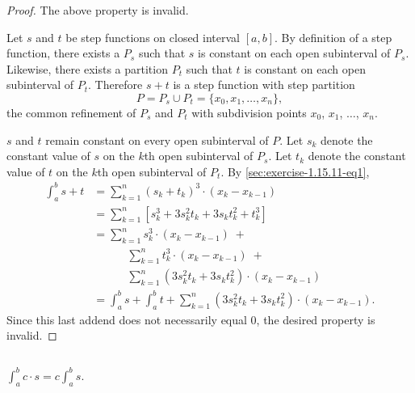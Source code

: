 \documentclass{report}
\begin{document}
\begin{proof}

  The above property is invalid.

  \divider

  Let $s$ and $t$ be step functions on closed interval $[a, b]$.
  By definition of a step function, there exists a 
    $P_s$ such that $s$ is constant on each open subinterval of $P_s$.
  Likewise, there exists a partition $P_t$ such that $t$ is constant on each
    open subinterval of $P_t$.
  Therefore $s + t$ is a step function with step partition
    $$P = P_s \cup P_t = \{x_0, x_1, \ldots, x_n\},$$
    the common refinement of $P_s$ and $P_t$ with subdivision points
    $x_0$, $x_1$, $\ldots$, $x_n$.

  $s$ and $t$ remain constant on every open subinterval of $P$.
  Let $s_k$ denote the constant value of $s$ on the $k$th open subinterval of
    $P_s$.
  Let $t_k$ denote the constant value of $t$ on the $k$th open subinterval of
    $P_t$.
  By \eqref{sec:exercise-1.15.11-eq1},
    \begin{align*}
      \int_a^b s + t
        & = \sum_{k=1}^n (s_k + t_k)^3 \cdot (x_k - x_{k-1}) \\
        & = \sum_{k=1}^n
            \left[ s_k^3 + 3s_k^2t_k + 3s_kt_k^2 + t_k^3 \right] \\
        & = \sum_{k=1}^n s_k^3 \cdot (x_k - x_{k-1}) \;+ \\
          & \quad\qquad
            \sum_{k=1}^n t_k^3 \cdot (x_k - x_{k-1}) \;+ \\
          & \quad\qquad
            \sum_{k=1}^n (3s_k^2t_k + 3s_kt_k^2) \cdot (x_k - x_{k - 1}) \\
        & = \int_a^b s + \int_a^b t +
            \sum_{k=1}^n (3s_k^2t_k + 3s_kt_k^2) \cdot (x_k - x_{k - 1}).
    \end{align*}
  Since this last addend does not necessarily equal $0$, the desired property is
    invalid.

\end{proof}

\subsection{}%
\label{sub:exercise-1.15.11c}

$\int_a^b c \cdot s = c \int_a^b s$.

\end{document}

